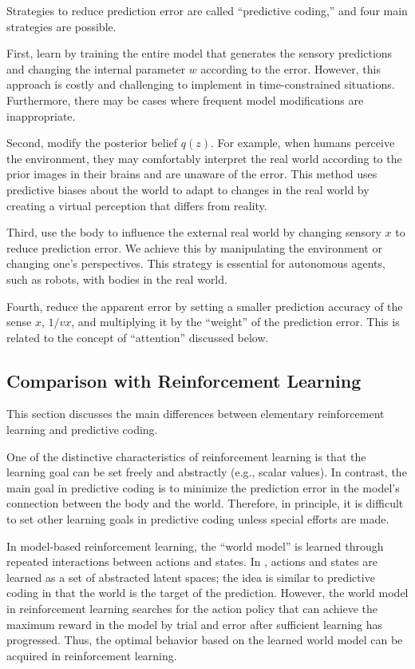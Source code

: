 Strategies to reduce prediction error are called ``predictive coding,'' and four main strategies are possible.

First, learn by training the entire model that generates the sensory predictions and changing the internal parameter $w$ according to the error. However, this approach is costly and challenging to implement in time-constrained situations. Furthermore, there may be cases where frequent model modifications are inappropriate.

Second, modify the posterior belief $q(z)$. For example, when humans perceive the environment, they may comfortably interpret the real world according to the prior images in their brains and are unaware of the error. This method uses predictive biases about the world to adapt to changes in the real world by creating a virtual perception that differs from reality.

Third, use the body to influence the external real world by changing sensory $x$ to reduce prediction error. We achieve this by manipulating the environment or changing one's perspectives. This strategy is essential for autonomous agents, such as robots, with bodies in the real world.

Fourth, reduce the apparent error by setting a smaller prediction accuracy of the sense $x$, $1/vx$, and multiplying it by the ``weight'' of the prediction error.
This is related to the concept of ``attention'' discussed below.




\subsection{Comparison with Reinforcement Learning}
This section discusses the main differences between elementary reinforcement learning and predictive coding. 

One of the distinctive characteristics of reinforcement learning is that the learning goal can be set freely and abstractly (e.g., scalar values).
In contrast, the main goal in predictive coding is to minimize the prediction error in the model's connection between the body and the world.
Therefore, in principle, it is difficult to set other learning goals in predictive coding unless special efforts are made.

In model-based reinforcement learning, the ``world model'' is learned through repeated interactions between actions and states.
In \cite{ha2018world}, actions and states are learned as a set of abstracted latent spaces; the idea is similar to predictive coding in that the world is the target of the prediction.
However, the world model in reinforcement learning searches for the action policy that can achieve the maximum reward in the model by trial and error after sufficient learning has progressed.
Thus, the optimal behavior based on the learned world model can be acquired in reinforcement learning.

